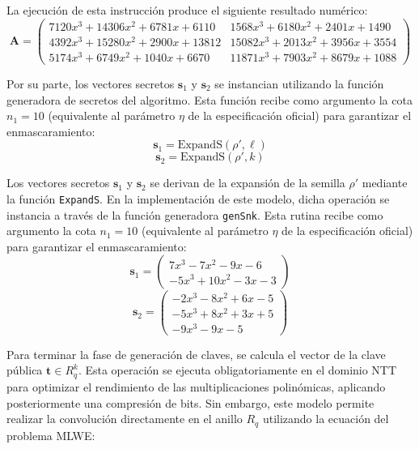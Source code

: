\documentclass[11pt, a4paper]{report}
\theoremstyle{definition}
\begin{document}
La ejecución de esta instrucción produce el siguiente resultado numérico:
\begin{equation}
    \mathbf{A} = \begin{pmatrix}
    7120x^3 + 14306x^2 + 6781x + 6110 & 1568x^3 + 6180x^2 + 2401x + 1490 \\
    4392x^3 + 15280x^2 + 2900x + 13812 & 15082x^3 + 2013x^2 + 3956x + 3554 \\
    5174x^3 + 6749x^2 + 1040x + 6670 & 11871x^3 + 7903x^2 + 8679x + 1088
    \end{pmatrix}
\end{equation}

Por su parte, los vectores secretos $\mathbf{s}_1$ y $\mathbf{s}_2$ se instancian utilizando la función generadora de secretos del algoritmo. Esta función recibe como argumento la cota $n_1 = 10$ (equivalente al parámetro $\eta$ de la especificación oficial) para garantizar el enmascaramiento:
\begin{equation}
    \mathbf{s}_1 = \text{ExpandS}(\rho', \ell)
\end{equation}
\begin{equation}
    \mathbf{s}_2 = \text{ExpandS}(\rho', k)
\end{equation}

Los vectores secretos $\mathbf{s}_1$ y $\mathbf{s}_2$ se derivan de la expansión de la semilla $\rho'$ mediante la función \texttt{ExpandS}. En la implementación de este modelo, dicha operación se instancia a través de la función generadora \texttt{genSnk}. Esta rutina recibe como argumento la cota $n_1 = 10$ (equivalente al parámetro $\eta$ de la especificación oficial) para garantizar el enmascaramiento:
\begin{equation}
    \mathbf{s}_1 = \begin{pmatrix}
    7x^3 - 7x^2 - 9x - 6 \\
    -5x^3 + 10x^2 - 3x - 3
    \end{pmatrix}
\end{equation}
\begin{equation}
    \mathbf{s}_2 = \begin{pmatrix}
    -2x^3 - 8x^2 + 6x - 5 \\
    -5x^3 + 8x^2 + 3x + 5 \\
    -9x^3 - 9x - 5
    \end{pmatrix}
\end{equation}

Para terminar la fase de generación de claves, se calcula el vector de la clave pública $\mathbf{t} \in R_q^k$. Esta operación se ejecuta obligatoriamente en el dominio NTT para optimizar el rendimiento de las multiplicaciones polinómicas, aplicando posteriormente una compresión de bits. Sin embargo, este modelo permite realizar la convolución directamente en el anillo $R_q$ utilizando la ecuación del problema MLWE:
\end{document}
